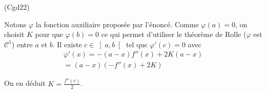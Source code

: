 \begin{tiny}(Cgd22)\end{tiny} Notons $\varphi$ la fonction auxiliaire proposée par l'énoncé. Comme $\varphi(a)=0$, on choisit $K$ pour que $\varphi(b)=0$ ce qui permet d'utiliser le théorème de Rolle ($\varphi$ est $\mathcal{C}^1$) entre $a$ et $b$. Il existe $c\in \left] a,b \right[$ tel que $\varphi'(c)=0$ avec 
\begin{multline*}
 \varphi'(x) = -(a-x)f''(x) + 2K(a-x) \\
 =(a-x)\left( -f''(x) + 2K\right) 
\end{multline*}

On en déduit $K=\frac{f''(c)}{2}$.
